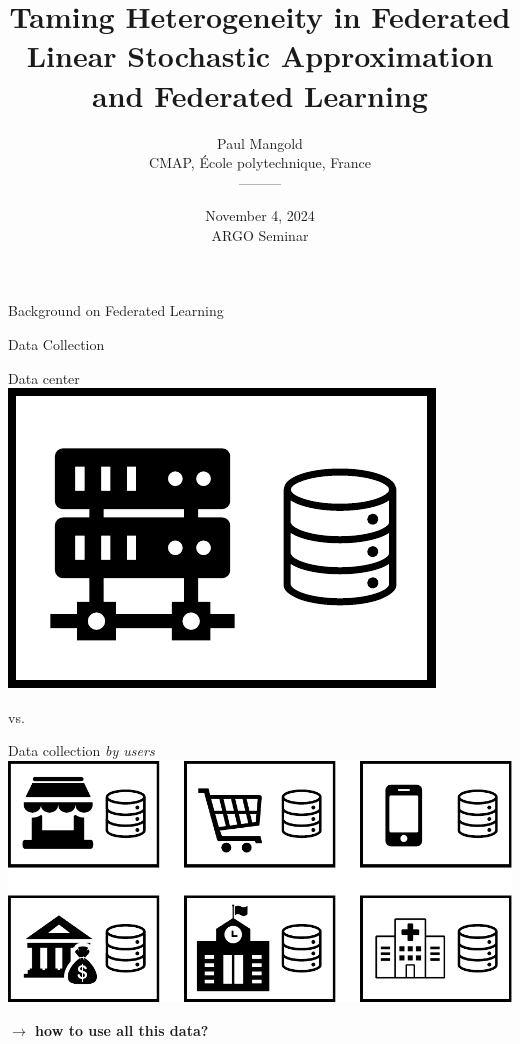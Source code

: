 \documentclass[aspectratio=169,14pt]{beamer}
\title{Taming Heterogeneity in Federated Linear Stochastic Approximation and Federated Learning}
\author{
  \vspace{-0.5em}
  Paul Mangold\\[0.5em]
  CMAP, École polytechnique, France\\[0.5em]
  ---------\\
  \vspace{-1em}
}
\institute{}
\date{November 4, 2024 \\
ARGO Seminar}
\begin{document}

\begin{frame}[plain]
  \titlepage
\end{frame}
\addtocounter{framenumber}{-1}

\begin{frame}
  \begin{center}
    \textcolor{beamer@blendedblue}{
      \huge Background on Federated Learning
    }
  \end{center}
\end{frame}

\begin{frame}{Data Collection}
  \hspace{-3em}
  \begin{minipage}{0.5\linewidth}
    \begin{center}
      Data center\\[0.5em]
      
      \includegraphics[width=0.4\linewidth]{images/central.pdf}
    \end{center}
    
  \end{minipage}\pause vs.\hspace{1.5em}%
  \begin{minipage}{0.5\linewidth}
    \pause
    \begin{center}
      Data collection \emph{by users} \\[0.5em]
      
      \includegraphics[width=0.8\linewidth]{images/decentralized.pdf}
    \end{center}
  \end{minipage}

  \vspace{1em}

  \pause
  
  \begin{center}
    \textbf{
    $\rightarrow$ how to use all this data?}
  \end{center}
\end{frame}
\end{document}
